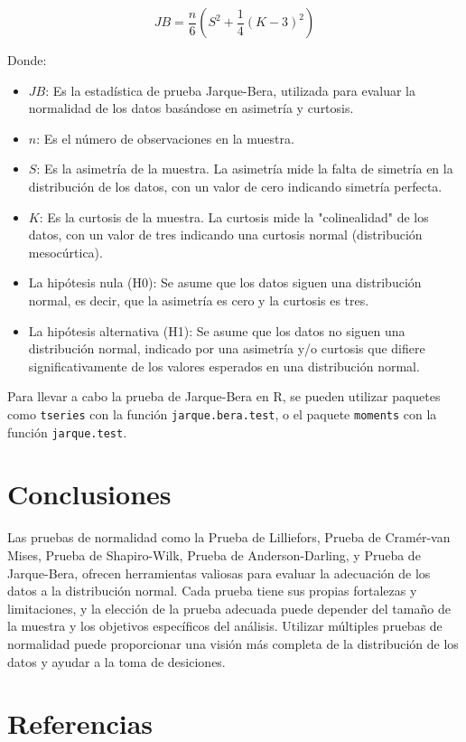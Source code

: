 \documentclass{article}
\begin{document}
\[JB = \frac{n}{6} \left(S^2 + \frac{1}{4}(K - 3)^2\right)\]

Donde:
\begin{itemize}
    \item \(JB\): Es la estadística de prueba Jarque-Bera, utilizada para evaluar la normalidad de los datos basándose en asimetría y curtosis.
    \item \(n\): Es el número de observaciones en la muestra.
    \item \(S\): Es la asimetría de la muestra. La asimetría mide la falta de simetría en la distribución de los datos, con un valor de cero indicando simetría perfecta.
    \item \(K\): Es la curtosis de la muestra. La curtosis mide la "colinealidad" de los datos, con un valor de tres indicando una curtosis normal (distribución mesocúrtica).
    \item La hipótesis nula (H0): Se asume que los datos siguen una distribución normal, es decir, que la asimetría es cero y la curtosis es tres.
    \item La hipótesis alternativa (H1): Se asume que los datos no siguen una distribución normal, indicado por una asimetría y/o curtosis que difiere significativamente de los valores esperados en una distribución normal.
\end{itemize}


Para llevar a cabo la prueba de Jarque-Bera en R, se pueden utilizar paquetes como \texttt{tseries} con la función \texttt{jarque.bera.test}, o el paquete \texttt{moments} con la función \texttt{jarque.test}.

\section{Conclusiones}

Las pruebas de normalidad como la Prueba de Lilliefors, Prueba de Cramér-van Mises, Prueba de Shapiro-Wilk, Prueba de Anderson-Darling, y Prueba de Jarque-Bera, ofrecen herramientas valiosas para evaluar la adecuación de los datos a la distribución normal. Cada prueba tiene sus propias fortalezas y limitaciones, y la elección de la prueba adecuada puede depender del tamaño de la muestra y los objetivos específicos del análisis. Utilizar múltiples pruebas de normalidad puede proporcionar una visión más completa de la distribución de los datos y ayudar a la toma de desiciones.

\section{Referencias}
\end{document}
